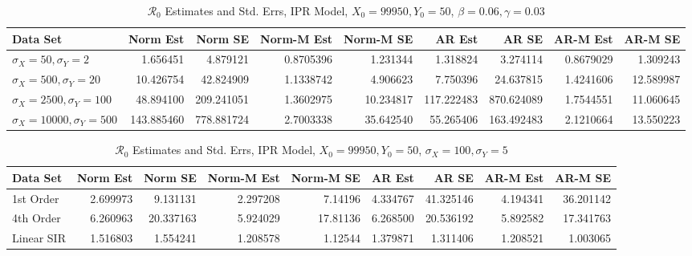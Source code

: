 \documentclass[12pt]{article}
\newcommand{\rr}{\ensuremath{\mathcal{R}_0}}
\begin{document}
\begin{table}[H]
	
	\caption{\label{tab:}$\rr$ Estimates and Std. Errs, IPR Model,
		$X_0 = 99950, Y_0 = 50$, $\beta = 0.06, \gamma = 0.03$}
	\centering
	\begin{footnotesize}
		\begin{tabular}[t]{l|r|r|r|r|r|r|r|r}
			\hline
			Data Set & Norm Est & Norm SE & Norm-M Est & Norm-M SE & AR Est & AR SE & AR-M Est & AR-M SE\\
			\hline
			$\sigma_X = 50, \sigma_Y = 2$ & 1.656451 & 4.879121 & 0.8705396 & 1.231344 & 1.318824 & 3.274114 & 0.8679029 & 1.309243\\
			\hline
			$\sigma_X = 500, \sigma_Y = 20$ & 10.426754 & 42.824909 & 1.1338742 & 4.906623 & 7.750396 & 24.637815 & 1.4241606 & 12.589987\\
			\hline
			$\sigma_X = 2500, \sigma_Y = 100$ & 48.894100 & 209.241051 & 1.3602975 & 10.234817 & 117.222483 & 870.624089 & 1.7544551 & 11.060645\\
			\hline
			$\sigma_X = 10000, \sigma_Y = 500$ & 143.885460 & 778.881724 & 2.7003338 & 35.642540 & 55.265406 & 163.492483 & 2.1210664 & 13.550223\\
			\hline
		\end{tabular}
	\end{footnotesize}
\end{table}

\begin{table}[H]
	
	\caption{\label{tab:}$\rr$ Estimates and Std. Errs, IPR Model,
		$X_0 = 99950, Y_0 = 50$, $\sigma_X = 100, \sigma_Y = 5$}
	\centering
	\begin{footnotesize}
		\begin{tabular}[t]{l|r|r|r|r|r|r|r|r}
			\hline
			Data Set & Norm Est & Norm SE & Norm-M Est & Norm-M SE & AR Est & AR SE & AR-M Est & AR-M SE\\
			\hline
			1st Order & 2.699973 & 9.131131 & 2.297208 & 7.14196 & 4.334767 & 41.325146 & 4.194341 & 36.201142\\
			\hline
			4th Order & 6.260963 & 20.337163 & 5.924029 & 17.81136 & 6.268500 & 20.536192 & 5.892582 & 17.341763\\
			\hline
			Linear SIR & 1.516803 & 1.554241 & 1.208578 & 1.12544 & 1.379871 & 1.311406 & 1.208521 & 1.003065\\
			\hline
		\end{tabular}
	\end{footnotesize}
\end{table}
\end{document}
